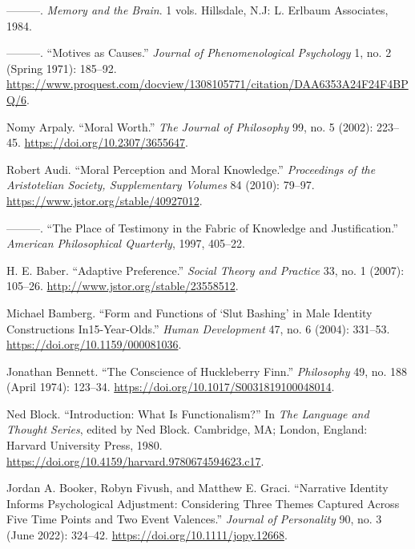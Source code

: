 \documentclass[phdthesis,12pt,final,a4paper]{wuthesis}
\newlength{\cslhangindent}
\newenvironment{CSLReferences}[2] %
{\begin{list}{}{%
	\setlength{\itemindent}{0pt}
	\setlength{\leftmargin}{0pt}
	\setlength{\parsep}{0pt}
	\ifodd #1
	\setlength{\leftmargin}{\cslhangindent}
	\setlength{\itemindent}{-1\cslhangindent}
	\fi
	\setlength{\itemsep}{#2\baselineskip}}}
{\end{list}}
\theoremstyle{definition}
\theoremstyle{definition}
\theoremstyle{definition}
\theoremstyle{definition}
\theoremstyle{remark}
\begin{document}
\begin{CSLReferences}{1}{0}
---------. \emph{Memory and the Brain}. 1 vols. Hillsdale, N.J: L. Erlbaum Associates, 1984.

---------. {``Motives as Causes.''} \emph{Journal of Phenomenological Psychology} 1, no. 2 (Spring 1971): 185--92. \url{https://www.proquest.com/docview/1308105771/citation/DAA6353A24F24F4BPQ/6}.

Nomy Arpaly. {``Moral {Worth}.''} \emph{The Journal of Philosophy} 99, no. 5 (2002): 223--45. \url{https://doi.org/10.2307/3655647}.

Robert Audi. {``Moral {Perception} and {Moral Knowledge}.''} \emph{Proceedings of the Aristotelian Society, Supplementary Volumes} 84 (2010): 79--97. \url{https://www.jstor.org/stable/40927012}.

---------. {``The {Place} of {Testimony} in the {Fabric} of {Knowledge} and {Justification}.''} \emph{American Philosophical Quarterly}, 1997, 405--22.

H. E. Baber. {``Adaptive {Preference}.''} \emph{Social Theory and Practice} 33, no. 1 (2007): 105--26. \url{http://www.jstor.org/stable/23558512}.

Michael Bamberg. {``Form and {Functions} of {`{Slut Bashing}'} in {Male Identity Constructions} In15-{Year-Olds}.''} \emph{Human Development} 47, no. 6 (2004): 331--53. \url{https://doi.org/10.1159/000081036}.

Jonathan Bennett. {``The {Conscience} of {Huckleberry Finn}.''} \emph{Philosophy} 49, no. 188 (April 1974): 123--34. \url{https://doi.org/10.1017/S0031819100048014}.

Ned Block. {``Introduction: What Is Functionalism?''} In \emph{The {Language} and {Thought Series}}, edited by Ned Block. Cambridge, MA; London, England: Harvard University Press, 1980. \url{https://doi.org/10.4159/harvard.9780674594623.c17}.

Jordan A. Booker, Robyn Fivush, and Matthew E. Graci. {``Narrative {Identity Informs Psychological Adjustment}: {Considering} Three Themes Captured Across Five Time Points and Two Event Valences.''} \emph{Journal of Personality} 90, no. 3 (June 2022): 324--42. \url{https://doi.org/10.1111/jopy.12668}.


\end{CSLReferences}
\end{document}

